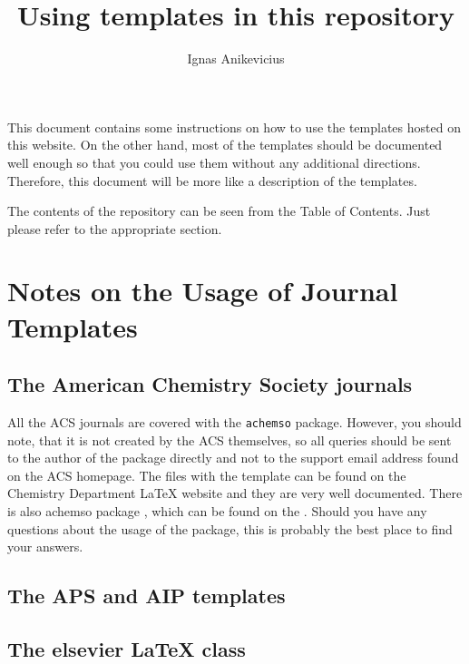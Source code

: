 \documentclass[
]{scrartcl}
\title{Using templates in this repository}
\author{Ignas Anikevicius}
\begin{document}
\maketitle
\tableofcontents
\listoftodos{\vskip 1em}

This document contains some instructions on how to use the templates hosted on
    this website. 
%
On the other hand, most of the templates should be documented well enough so
    that you could use them without any additional directions.
%
Therefore, this document will be more like a description of the templates.

The contents of the repository can be seen from the Table of Contents.
%
Just please refer to the appropriate section.


\section{Notes on the Usage of Journal Templates}

%
\subsection{The American Chemistry Society journals}

%
All the ACS journals are covered with the \verb|achemso| package. 
%
However, you should note, that it is not created by the ACS themselves, so all
    queries should be sent to the author of the package directly and not to the
    support email address found on the ACS homepage.
%
The files with the template can be found on the Chemistry Department
    \LaTeX{} website and they are very well documented.
%
There is also achemso package
    ,
    which can be found on the
    .
%
Should you have any questions about the usage of the package, this is probably
    the best place to find your answers.

%
\subsection{The APS and AIP templates}

%
\subsection{The elsevier \LaTeX{} class}
\end{document}
